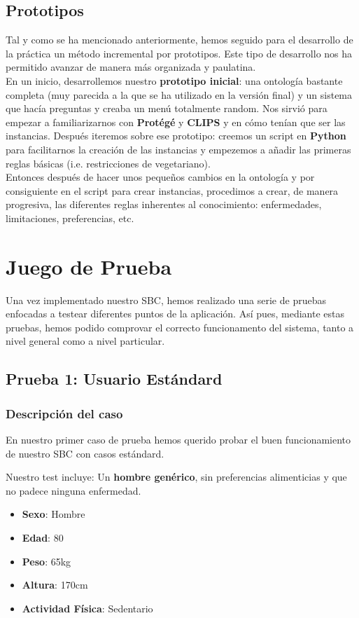 \documentclass[11]{article}
\begin{document}
\subsection{Prototipos}
Tal y como se ha mencionado anteriormente, hemos seguido para el desarrollo de la práctica un método incremental por prototipos. Este tipo de desarrollo nos ha permitido avanzar de manera más organizada y paulatina. 
\\
En un inicio, desarrollemos nuestro \textbf{prototipo inicial}: una ontología bastante completa (muy parecida a la que se ha utilizado en la versión final) y un sistema que hacía preguntas y creaba un menú totalmente random.  Nos sirvió para empezar a familiarizarnos con \textbf{Protégé} y \textbf{CLIPS} y en cómo tenían que ser las instancias. Después iteremos sobre ese prototipo: creemos un script en \textbf{Python} para facilitarnos la creación de las instancias y empezemos a añadir las primeras reglas básicas (i.e. restricciones de vegetariano). 
\\
Entonces después de hacer unos pequeños cambios en la ontología y por consiguiente en el script para crear instancias, procedimos a crear, de manera progresiva, las diferentes reglas inherentes al conocimiento: enfermedades, limitaciones, preferencias, etc.

\section{Juego de Prueba}
Una vez implementado nuestro SBC, hemos realizado una serie de pruebas enfocadas a testear diferentes puntos de la aplicación. Así pues, mediante estas pruebas, hemos podido comprovar el correcto funcionamento del sistema, tanto a nivel general como a nivel particular.

\subsection{Prueba 1: Usuario Estándard}
\subsubsection{Descripción del caso}
En nuestro primer caso de prueba hemos querido probar el buen funcionamiento de nuestro SBC con casos estándard. 
\medskip

Nuestro test incluye:
Un \textbf{hombre genérico}, sin preferencias alimenticias y que no padece ninguna enfermedad.

\begin{itemize}
\item \textbf{Sexo}: Hombre
\item \textbf{Edad}: 80
\item \textbf{Peso}: 65kg
\item \textbf{Altura}: 170cm
\item \textbf{Actividad Física}: Sedentario
\end{itemize}
\end{document}
